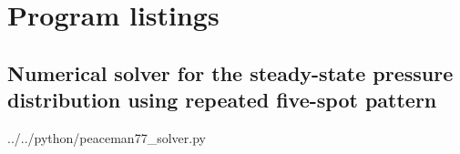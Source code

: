 \section{Program listings} %
\label{sec:program_listings}

\subsection{Numerical solver for the steady-state pressure distribution using repeated five-spot pattern} %
\label{sub:numerical_solver_for_the_steady_state_pressure_distribution_using_repeated_five_spot_pattern}


  {../../python/peaceman77_solver.py}

